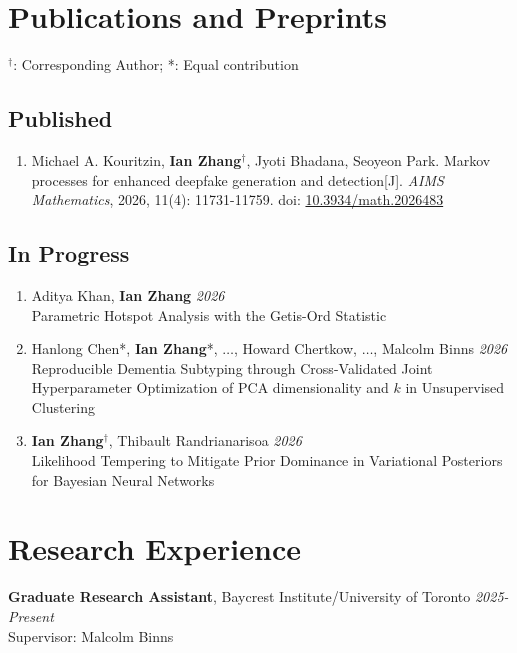 \documentclass[11pt]{article}
\theoremstyle{definition}
\newcommand{\1}{\mathds 1}
\begin{document}
\section*{Publications and Preprints}
{\small $^\dag$: Corresponding Author; \hspace{1cm} *: Equal contribution}
\subsection*{Published}
\begin{enumerate}
    \item Michael A. Kouritzin, \textbf{Ian Zhang}$^\dag$, Jyoti Bhadana, Seoyeon Park. Markov processes for enhanced deepfake generation and detection[J]. \textit{AIMS Mathematics}, 2026, 11(4): 11731-11759. doi: \url{10.3934/math.2026483}
\end{enumerate}

\subsection*{In Progress}
\begin{enumerate}
    \item Aditya Khan, \textbf{Ian Zhang} \hfill \textit{2026}\\
    Parametric Hotspot Analysis with the Getis-Ord Statistic
    \item Hanlong Chen*, \textbf{Ian Zhang}*, $\ldots$, Howard Chertkow, $\ldots$, Malcolm Binns \hfill \textit{2026}\\
    Reproducible Dementia Subtyping through Cross-Validated Joint Hyperparameter Optimization of PCA dimensionality and $k$ in Unsupervised Clustering
    \item \textbf{Ian Zhang}$^\dag$, Thibault Randrianarisoa \hfill \textit{2026}\\
    Likelihood Tempering to Mitigate Prior Dominance in Variational Posteriors for Bayesian Neural Networks 
\end{enumerate}

\section*{Research Experience}
\textbf{Graduate Research Assistant}, Baycrest Institute/University of Toronto \hfill \textit{2025-Present}\\
\indent\hspace{0.2cm} Supervisor: Malcolm Binns
\vspace{0.5em}
\end{document}
